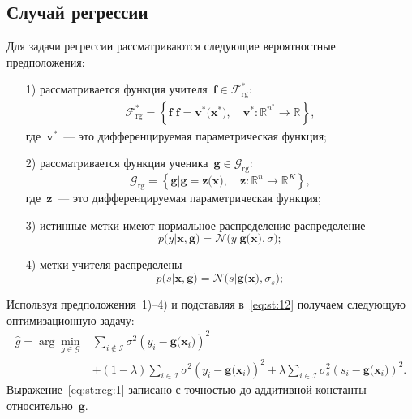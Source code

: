 \documentclass[12pt, twoside]{article}
\begin{document}
\subsection{Случай регрессии}
Для задачи регрессии рассматриваются следующие вероятностные предположения:
\begin{enumerate}
	\item[1)] рассматривается функция учителя~$\mathbf{f}\in\mathcal{F}_{\text{rg}}^{*}$:
	\[
	\label{eq:F:set:priv}
	\begin{aligned}
	\mathcal{F}_{\text{rg}}^* = \left\{\mathbf{f}| \mathbf{f} = \mathbf{v}^*\bigr(\mathbf{x}^*\bigr), \quad \mathbf{v}^*: \mathbb{R}^{n^*} \to \mathbb{R} \right\},
	\end{aligned}
	\]
	где~$\mathbf{v}^*$~--- это дифференцируемая параметрическая функция;
	\item[2)] рассматривается функция ученика~$\mathbf{g}\in\mathcal{G}_{\text{rg}}$:
\[
\label{eq:G:set:cl}
\mathcal{G}_{\text{rg}} = \left\{\mathbf{g}| \mathbf{g} = \mathbf{z}\bigr(\mathbf{x}\bigr), \quad \mathbf{z}: \mathbb{R}^n \to \mathbb{R}^K \right\},
\]
где~$\mathbf{z}$~--- это дифференцируемая параметрическая функция;
	\item[3)] истинные метки имеют нормальное распределение распределение
	\[
		p\bigr(y|\mathbf{x}, \mathbf{g}\bigr) = \mathcal{N}\bigr(y|\mathbf{g}\bigr(\mathbf{x}\bigr), \sigma\bigr);
	\]
	\item[4)] метки учителя распределены
	\[
		p\bigr(s| \mathbf{x}, \mathbf{g}\bigr) = \mathcal{N}\bigr(s|\mathbf{g}\bigr(\mathbf{x}\bigr), \sigma_s\bigr);
	\]
\end{enumerate}

Используя предположения~1)--4) и подставляя в~\eqref{eq:st:12} получаем следующую оптимизационную задачу:
\[
\label{eq:st:reg:1}
\begin{aligned}
\hat{g} = \arg\min_{g\in \mathcal{G}} & \sum_{i\not\in \mathcal{I}}\sigma^2\left(y_i-\mathbf{g}\bigr(\mathbf{x}_i\bigr)\right)^2 \\
&+ \left(1-\lambda\right)\sum_{i\in \mathcal{I}}\sigma^2\left(y_i-\mathbf{g}\bigr(\mathbf{x}_i\bigr)\right)^2 + \lambda\sum_{i\in \mathcal{I}}\sigma_s^2\left(s_i-\mathbf{g}\bigr(\mathbf{x}_i\bigr)\right)^2.
\end{aligned}
\]
Выражение~\eqref{eq:st:reg:1} записано с точностью до аддитивной константы относительно~$\mathbf{g}$. 
\end{document}

